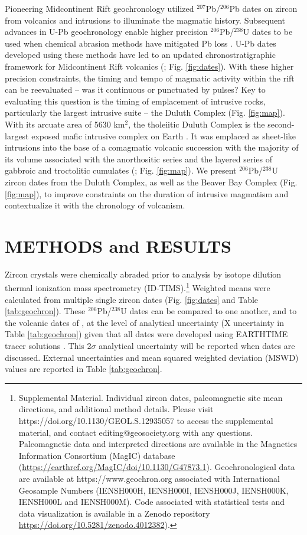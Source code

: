 \documentclass[11pt,letterpaper]{article}
\begin{document}
Pioneering Midcontinent Rift geochronology utilized $^{207}$Pb/$^{206}$Pb dates on zircon from volcanics \citep{Davis1997a} and intrusions \citep{Paces1993a} to illuminate the magmatic history. Subsequent advances in U-Pb geochronology enable higher precision $^{206}$Pb/$^{238}$U dates to be used when chemical abrasion methods have mitigated Pb loss \citep{Mattinson2005a}.  U-Pb dates developed using these methods have led to an updated chronostratigraphic framework for Midcontinent Rift volcanics (\citealp{Swanson-Hysell2019a}; Fig. \ref{fig:dates}). With these higher precision constraints, the timing and tempo of magmatic activity within the rift can be reevaluated -- was it continuous or punctuated by pulses? Key to evaluating this question is the timing of emplacement of intrusive rocks, particularly the largest intrusive suite -- the Duluth Complex (Fig. \ref{fig:map}). With its arcuate area of 5630 km$^2$, the tholeiitic Duluth Complex is the second-largest exposed mafic intrusive complex on Earth \citep{Miller2002c}. It was emplaced as sheet-like intrusions into the base of a comagmatic volcanic succession with the majority of its volume associated with the anorthositic series and the layered series of gabbroic and troctolitic cumulates (\citealp{Miller2002c}; Fig. \ref{fig:map}). We present $^{206}$Pb/$^{238}$U zircon dates from the Duluth Complex, as well as the Beaver Bay Complex (Fig. \ref{fig:map}), to improve constraints on the duration of intrusive magmatism and contextualize it with the chronology of volcanism.

\section*{METHODS and RESULTS}

Zircon crystals were chemically abraded prior to analysis by isotope dilution thermal ionization mass spectrometry (ID-TIMS).\footnote{Supplemental Material. Individual zircon dates, paleomagnetic site mean directions, and additional method details. Please visit https://doi.org/10.1130/GEOL.S.12935057 to access the supplemental material, and contact editing@geosociety.org with any questions. Paleomagnetic data and interpreted directions are available in the Magnetics Information Consortium (MagIC) database (\url{https://earthref.org/MagIC/doi/10.1130/G47873.1}). Geochronological data are available at https://www.geochron.org associated with International Geosample Numbers (IENSH000H, IENSH000I, IENSH000J, IENSH000K, IENSH000L and IENSH000M). Code associated with statistical tests and data visualization is available in a Zenodo repository \url{https://doi.org/10.5281/zenodo.4012382}).} Weighted means were calculated from multiple single zircon dates (Fig. \ref{fig:dates} and Table \ref{tab:geochron}). These $^{206}$Pb/$^{238}$U dates can be compared to one another, and to the volcanic dates of \cite{Swanson-Hysell2019a}, at the level of analytical uncertainty (X uncertainty in Table \ref{tab:geochron}) given that all dates were developed using EARTHTIME tracer solutions \citep{Condon2015a}. This 2$\sigma$ analytical uncertainty will be reported when dates are discussed. External uncertainties and mean squared weighted deviation (MSWD) values are reported in Table \ref{tab:geochron}.
\end{document}
